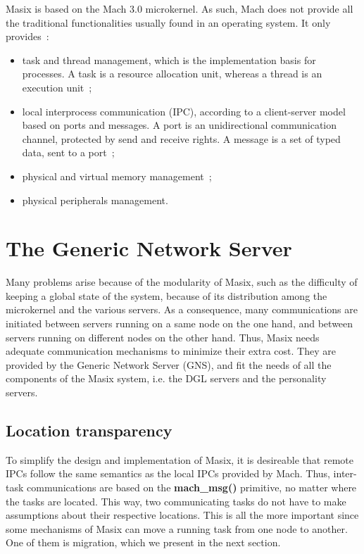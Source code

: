 
Masix is based on the Mach 3.0 microkernel. As such, Mach does not provide
all the traditional functionalities usually found in an operating system.
It only provides~:
\begin{itemize}
\item task and thread management, which is the implementation basis for 
processes. A task is a resource allocation unit, whereas a thread is an
execution unit~;
\item local interprocess communication (IPC), according to a client-server model
 based on ports and messages. A port is an unidirectional communication channel,
protected by send and receive rights. A message is a set of typed data, sent to a port~;
\item physical and virtual memory management~;
\item physical peripherals management.
\end{itemize}


\section {The Generic Network Server}

Many problems arise because of the modularity of Masix, such as the difficulty
of keeping a global state of the system, because of its distribution
among the microkernel and the various servers. As a consequence, many
communications are initiated between servers running on a same node on
the one hand, and between servers running on different nodes on the other hand. 
Thus, Masix needs adequate communication mechanisms to minimize their extra 
cost. 
They are provided by the Generic Network Server (GNS), and fit
the needs of all the components of the Masix system, i.e. the DGL servers
and the personality servers.

\subsection{Location transparency}

To simplify the design and implementation of Masix, it is desireable that
remote IPCs follow the same semantics as the local IPCs provided by Mach.
Thus, inter-task communications are based on the {\bf mach\_msg()} primitive,
no matter where the tasks are located.
This way, two communicating tasks do not have to make assumptions about their 
respective locations. 
This is all the more important since some mechanisms of Masix can move a running task from one node to another. One of them is migration, which we present in the next section.

